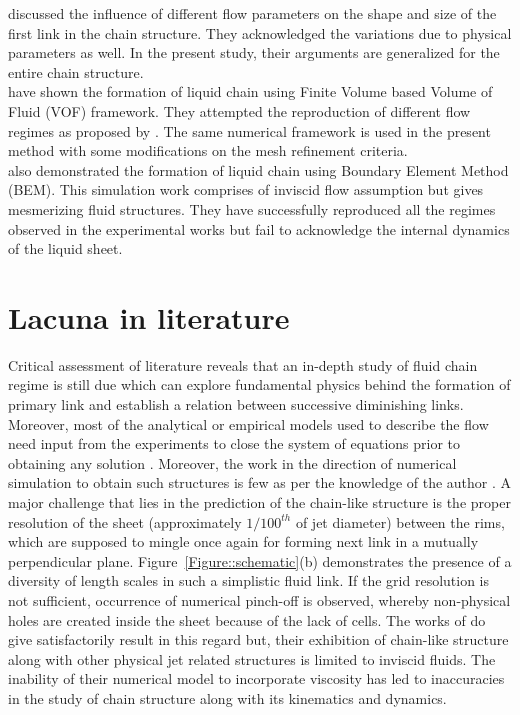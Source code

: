 \cite{yang2014liquid} discussed the influence of different flow parameters on the shape and size of the first link in the chain structure. They acknowledged the variations due to physical parameters as well. In the present study, their arguments are generalized for the entire chain structure.\\
\cite{chen2013high} have shown the formation of liquid chain using Finite Volume based Volume of Fluid (VOF) framework. They attempted the reproduction of different flow regimes as proposed by \cite{bush2004collision}. The same numerical framework is used in the present method with some modifications on the mesh refinement criteria.\\
\cite{da2016surface} also demonstrated the formation of liquid chain using Boundary Element Method (BEM). This simulation work comprises of inviscid flow assumption but gives mesmerizing fluid structures. They have successfully reproduced all the regimes observed in the experimental works but fail to acknowledge the internal dynamics of the liquid sheet.\\
\section{Lacuna in literature}
Critical assessment of literature reveals that an in-depth study of fluid chain regime is still due which can explore fundamental physics behind the formation of primary link and establish a relation between successive diminishing links. Moreover, most of the analytical or empirical models used to describe the flow need input from the experiments to close the system of equations prior to obtaining any solution \citep{bush2004collision}. Moreover, the work in the direction of numerical simulation to obtain such structures is few as per the knowledge of the author \citep{chen2013high,da2016surface}. A major challenge that lies in the prediction of the chain-like structure is the proper resolution of the sheet (approximately $1/100^{th}$ of jet diameter) between the rims, which are supposed to mingle once again for forming next link in a mutually perpendicular plane. Figure~\ref{Figure::schematic}(b) demonstrates the presence of a diversity of length scales in such a simplistic fluid link. If the grid resolution is not sufficient, occurrence of numerical pinch-off is observed, whereby non-physical holes are created inside the sheet because of the lack of cells. The works of \cite{da2016surface} do give satisfactorily result in this regard but, their exhibition of chain-like structure along with other physical jet related structures is limited to inviscid fluids. The inability of their numerical model to incorporate viscosity has led to inaccuracies in the study of chain structure along with its kinematics and dynamics. 
